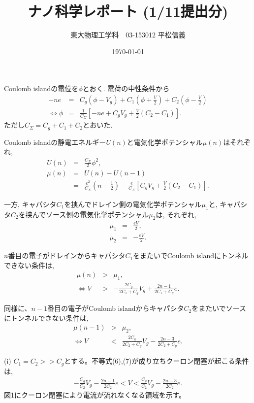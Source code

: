 \documentclass[11pt,a4paper]{jsarticle}
\title{ナノ科学レポート (1/11提出分)}
\author{東大物理工学科　03-153012 平松信義}
\date{\today}
\begin{document}
\maketitle

Coulomb islandの電位を$\phi$とおく. 電荷の中性条件から
\begin{eqnarray}
-ne &=& C_g (\phi-V_g)  + C_1(\phi+\frac{V}{2}) + C_2 (\phi-\frac{V}{2}) \nonumber \\
\iff \phi &=& \frac{1}{C_\Sigma} [-ne+C_gV_g +\frac{V}{2} (C_2-C_1)].
\end{eqnarray}
ただし$C_\Sigma=C_g+C_1+C_2$とおいた.

Coulomb islandの静電エネルギー$U(n)$と電気化学ポテンシャル$\mu(n)$はそれぞれ, 
\begin{eqnarray}
U(n) &=& \frac{C_\Sigma}{2}\phi^2, \\
\mu(n) &=& U(n) - U(n-1) \nonumber \\
&=& \frac{e^2}{C_\Sigma} (n-\frac{1}{2}) -  \frac{e}{C_\Sigma} [C_gV_g +\frac{V}{2} (C_2-C_1)].
\end{eqnarray}

一方, キャパシタ$C_1$を挟んでドレイン側の電気化学ポテンシャル$\mu_1$と, キャパシタ$C_2$を挟んでソース側の電気化学ポテンシャル$\mu_2$は, それぞれ, 
\begin{eqnarray}
\mu_1 &=& \frac{eV}{2},\\
\mu_2 &=& -\frac{eV}{2}.
\end{eqnarray}

$n$番目の電子がドレインからキャパシタ$C_1$をまたいでCoulomb islandにトンネルできない条件は,
\begin{eqnarray}
\mu(n) &>& \mu_1, \nonumber \\
\iff V &>& - \frac{2C_g}{2C_1+C_g}V_g +\frac{2n-1}{2C_1+C_g}e.
\end{eqnarray}

同様に、$n-1$番目の電子がCoulomb islandからキャパシタ$C_2$をまたいでソースにトンネルできない条件は, 
\begin{eqnarray}
\mu(n-1) &>& \mu_2, \nonumber \\
\iff V &<&  \frac{2C_g}{2C_2+C_g}V_g -\frac{2n-3}{2C_2+C_g}e.
\end{eqnarray}


(i) $C_1=C_2>>C_g$とする。不等式(6),(7)が成り立ちクーロン閉塞が起こる条件は,
\begin{eqnarray}
-\frac{C_g}{C_2}V_g -\frac{2n-1}{2C_2}e< V <  \frac{C_g}{C_2}V_g -\frac{2n-3}{2C_2}e.
\end{eqnarray}
図1にクーロン閉塞により電流が流れなくなる領域を示す。
\end{document}
